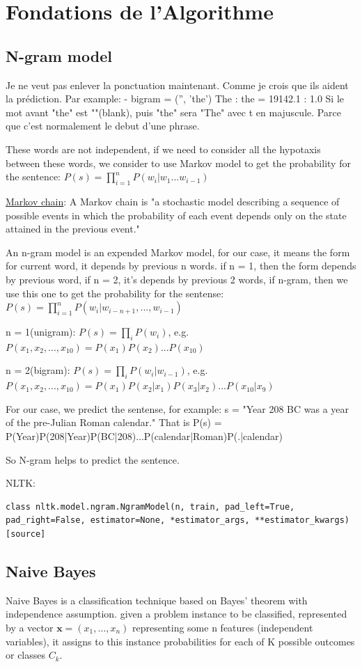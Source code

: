 \documentclass[a4paper]{article}
\begin{document}
\section{Fondations de l’Algorithme}
\subsection{N-gram model}
Je ne veut pas enlever la ponctuation maintenant. Comme je crois que ils aident la prédiction.  Par example:
- bigram = ('', 'the')       The : the    =  19142.1 : 1.0
Si le mot avant "the" est ""(blank), puis "the" sera "The" avec t en majuscule. Parce que c'est normalement le debut d'une phrase.

These words are not independent, if we need to consider all the hypotaxis between these words, we consider to use Markov model to get the probability for the sentence: $P(s)=\prod\limits_{i=1}^{n}P(w_i|w_1...w_{i-1})$

\href{https://en.wikipedia.org/wiki/Markov_chain}{Markov chain}: A Markov chain is "a stochastic model describing a sequence of possible events in which the probability of each event depends only on the state attained in the previous event."

An n-gram model is an expended Markov model, for our case, it means the form for current word, it depends by previous n words. if n = 1, then the form depends by previous word, if n = 2, it's depends by previous 2 words, if n-gram, then we use this one to get the probability for the sentense: $P(s)=\prod\limits_{i=1}^{n}P(w_i|w_{i-n+1},...,w_{i-1})$

n = 1(unigram): $P(s)=\prod\limits_{i}P(w_i)$, e.g. $P(x_1,x_2,...,x_{10}) = P(x_1)P(x_2)...P(x_{10})$

n = 2(bigram): $P(s)=\prod\limits_{i}P(w_i|w_{i-1})$, e.g. $P(x_1,x_2,...,x_{10}) = P(x_1)P(x_2|x_1)P(x_3|x_2)...P(x_{10}|x_9)$

For our case, we predict the sentense, for example: 
s = "Year 208 BC was a year of the pre-Julian Roman calendar." 
That is P(s) = P(Year)P(208|Year)P(BC|208)...P(calendar|Roman)P(.|calendar)

So N-gram helps to predict the sentence.

NLTK:
\begin{lstlisting}
class nltk.model.ngram.NgramModel(n, train, pad_left=True, pad_right=False, estimator=None, *estimator_args, **estimator_kwargs)[source]
\end{lstlisting}

\subsection{Naive Bayes}
Naive Bayes is a classification technique based on Bayes' theorem with independence assumption.  given a problem instance to be classified, represented by a vector ${\mathbf  {x}}=(x_{1},\dots ,x_{n})$ representing some n features (independent variables), it assigns to this instance probabilities for each of K possible outcomes or classes $C_{k}$. \cite{murty_pattern_2011}
\end{document}

